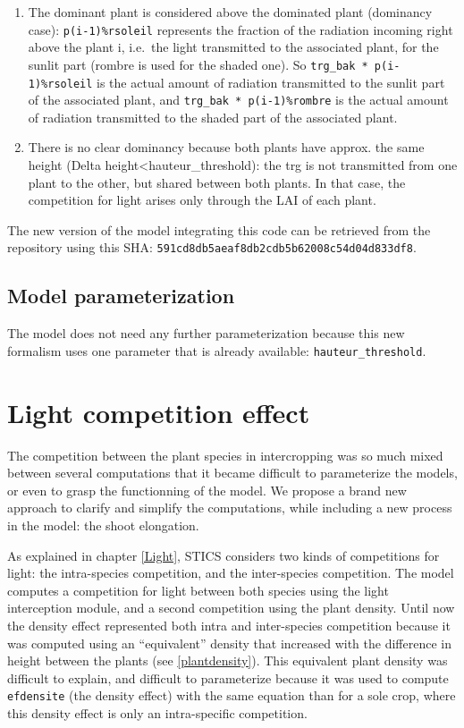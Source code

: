 \documentclass[
]{book}
\begin{document}
\begin{enumerate}
\def\labelenumi{\arabic{enumi}.}
\item
  The dominant plant is considered above the dominated plant (dominancy case): \texttt{p(i-1)\%rsoleil} represents the fraction of the radiation incoming right above the plant i, i.e.~the light transmitted to the associated plant, for the sunlit part (rombre is used for the shaded one). So \texttt{trg\_bak\ *\ p(i-1)\%rsoleil} is the actual amount of radiation transmitted to the sunlit part of the associated plant, and \texttt{trg\_bak\ *\ p(i-1)\%rombre} is the actual amount of radiation transmitted to the shaded part of the associated plant.
\item
  There is no clear dominancy because both plants have approx. the same height (Delta height\textless hauteur\_threshold): the trg is not transmitted from one plant to the other, but shared between both plants. In that case, the competition for light arises only through the LAI of each plant.
\end{enumerate}

The new version of the model integrating this code can be retrieved from the repository using this SHA: \texttt{591cd8db5aeaf8db2cdb5b62008c54d04d833df8}.

\hypertarget{model-parameterization-1}{%
\section{Model parameterization}\label{model-parameterization-1}}

The model does not need any further parameterization because this new formalism uses one parameter that is already available: \texttt{hauteur\_threshold}.

\hypertarget{lightcompetition}{%
\chapter{Light competition effect}\label{lightcompetition}}

The competition between the plant species in intercropping was so much mixed between several computations that it became difficult to parameterize the models, or even to grasp the functionning of the model. We propose a brand new approach to clarify and simplify the computations, while including a new process in the model: the shoot elongation.

As explained in chapter \ref{Light}, STICS considers two kinds of competitions for light: the intra-species competition, and the inter-species competition. The model computes a competition for light between both species using the light interception module, and a second competition using the plant density. Until now the density effect represented both intra and inter-species competition because it was computed using an ``equivalent'' density that increased with the difference in height between the plants (see \ref{plantdensity}). This equivalent plant density was difficult to explain, and difficult to parameterize because it was used to compute \texttt{efdensite} (the density effect) with the same equation than for a sole crop, where this density effect is only an intra-specific competition.
\end{document}
